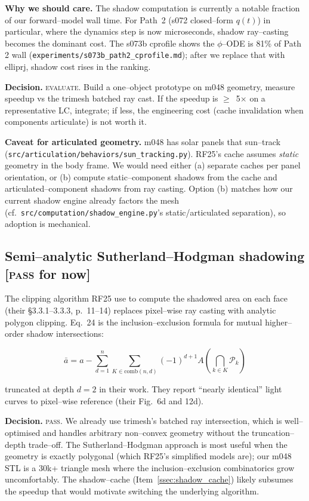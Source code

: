 \documentclass[11pt]{article}
\newcommand{\ttt}[1]{\texttt{#1}}
\begin{document}
\textbf{Why we should care.} The shadow computation is currently a notable
fraction of our forward--model wall time. For Path~2 (s072 closed--form $q(t)$)
in particular, where the dynamics step is now microseconds, shadow ray--casting
becomes the dominant cost. The s073b cprofile shows the $\phi$--ODE is 81\% of
Path 2 wall (\ttt{experiments/s073b\_path2\_cprofile.md}); after we replace
that with elliprj, shadow cost rises in the ranking.

\textbf{Decision.} \textsc{evaluate}. Build a one--object prototype on m048
geometry, measure speedup vs the trimesh batched ray cast. If the speedup is
$\geq$~5$\times$ on a representative LC, integrate; if less, the engineering
cost (cache invalidation when components articulate) is not worth it.

\textbf{Caveat for articulated geometry.} m048 has solar panels that sun--track
(\ttt{src/articulation/behaviors/sun\_tracking.py}). RF25's cache assumes
\emph{static} geometry in the body frame. We would need either (a) separate
caches per panel orientation, or (b) compute static--component shadows from the
cache and articulated--component shadows from ray casting. Option (b) matches
how our current shadow engine already factors the mesh (cf.\ \ttt{src/computation/shadow\_engine.py}'s
static/articulated separation), so adoption is mechanical.

\subsection{Semi--analytic Sutherland--Hodgman shadowing \textnormal{[\textsc{pass} for now]}}

\noindent
The clipping algorithm RF25 use to compute the shadowed area on each face
(their \S3.3.1--3.3.3, p.~11--14) replaces pixel--wise ray casting with
analytic polygon clipping. Eq.~24 is the inclusion--exclusion formula for
mutual higher--order shadow intersections:

\begin{equation}
\bar{a} = a - \sum_{d=1}^{n} \sum_{K \in \mathrm{comb}(n,d)}
(-1)^{d+1} A\!\left( \bigcap_{k \in K} \mathcal{P}_k \right)
\end{equation}

\noindent
truncated at depth $d=2$ in their work. They report ``nearly identical'' light
curves to pixel--wise reference (their Fig.~6d and 12d).

\textbf{Decision.} \textsc{pass}. We already use trimesh's batched ray
intersection, which is well--optimised and handles arbitrary non--convex
geometry without the truncation--depth trade--off. The Sutherland--Hodgman
approach is most useful when the geometry is exactly polygonal (which RF25's
simplified models are); our m048 STL is a 30k+ triangle mesh where the
inclusion--exclusion combinatorics grow uncomfortably. The shadow--cache
(Item~\ref{ssec:shadow_cache}) likely subsumes the speedup that would
motivate switching the underlying algorithm.
\end{document}
